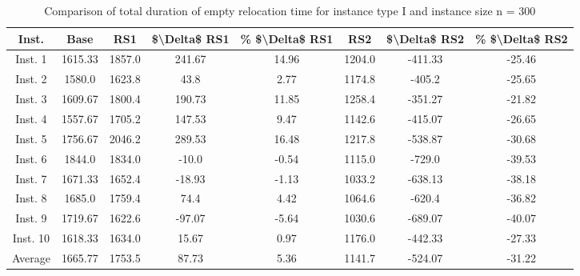 \begin{table}[H]
\centering
\begin{tabular}{cccccccc}
  \hline
  \textbf{Inst.} & \textbf{Base} & \textbf{RS1} & \textbf{\$\textbackslash{}Delta\$  RS1} & \textbf{\% \$\textbackslash{}Delta\$  RS1} & \textbf{RS2} & \textbf{\$\textbackslash{}Delta\$  RS2} & \textbf{\% \$\textbackslash{}Delta\$  RS2} \\\hline
  Inst. 1 & 1615.33 & 1857.0 & 241.67 & 14.96 & 1204.0 & -411.33 & -25.46 \\
  Inst. 2 & 1580.0 & 1623.8 & 43.8 & 2.77 & 1174.8 & -405.2 & -25.65 \\
  Inst. 3 & 1609.67 & 1800.4 & 190.73 & 11.85 & 1258.4 & -351.27 & -21.82 \\
  Inst. 4 & 1557.67 & 1705.2 & 147.53 & 9.47 & 1142.6 & -415.07 & -26.65 \\
  Inst. 5 & 1756.67 & 2046.2 & 289.53 & 16.48 & 1217.8 & -538.87 & -30.68 \\
  Inst. 6 & 1844.0 & 1834.0 & -10.0 & -0.54 & 1115.0 & -729.0 & -39.53 \\
  Inst. 7 & 1671.33 & 1652.4 & -18.93 & -1.13 & 1033.2 & -638.13 & -38.18 \\
  Inst. 8 & 1685.0 & 1759.4 & 74.4 & 4.42 & 1064.6 & -620.4 & -36.82 \\
  Inst. 9 & 1719.67 & 1622.6 & -97.07 & -5.64 & 1030.6 & -689.07 & -40.07 \\
  Inst. 10 & 1618.33 & 1634.0 & 15.67 & 0.97 & 1176.0 & -442.33 & -27.33 \\
  Average & 1665.77 & 1753.5 & 87.73 & 5.36 & 1141.7 & -524.07 & -31.22 \\\hline
\end{tabular}
\caption{Comparison of total duration of empty relocation time for instance type I and instance size n = 300}
\label{tab:wait:resrelocation-empty-relocation-comparison_I_300}
\end{table}
